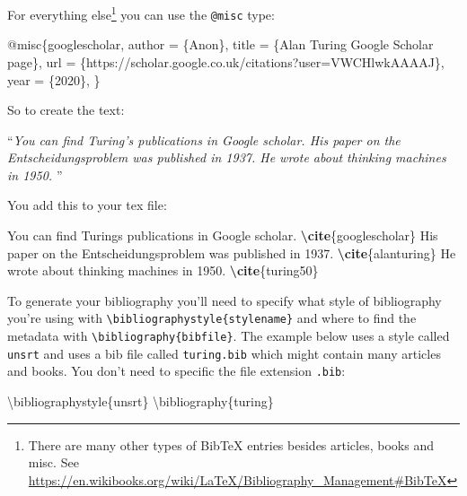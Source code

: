 \documentclass[
]{book}
\newenvironment{Shaded}{\begin{snugshade}}{\end{snugshade}}
\newcommand{\BuiltInTok}[1]{#1}
\newcommand{\ExtensionTok}[1]{#1}
\newcommand{\KeywordTok}[1]{\textcolor[rgb]{0.13,0.29,0.53}{\textbf{#1}}}
\newcommand{\NormalTok}[1]{#1}
\begin{document}
For everything else\footnote{There are many other types of BibTeX entries besides articles, books and misc. See \url{https://en.wikibooks.org/wiki/LaTeX/Bibliography_Management\#BibTeX}} you can use the \texttt{@misc} type:

\begin{Shaded}
\begin{Highlighting}[]
\NormalTok{@misc\{googlescholar,}
\NormalTok{  author       = \{Anon\},}
\NormalTok{  title        = \{Alan Turing Google Scholar page\},}
\NormalTok{  url          = \{https://scholar.google.co.uk/citations?user=VWCHlwkAAAAJ\},}
\NormalTok{  year         = \{2020\},}
\NormalTok{\}}
\end{Highlighting}
\end{Shaded}

So to create the text:

``\emph{You can find Turing's publications in Google scholar. \citep{googlescholar}
His paper on the Entscheidungsproblem was published in 1937. \citep{turing}
He wrote about thinking machines in 1950. \citep{turing50}}''

You add this to your tex file:

\begin{Shaded}
\begin{Highlighting}[]
\NormalTok{You can find Turing\textquotesingle{}s publications in Google scholar. }\KeywordTok{\textbackslash{}cite}\NormalTok{\{}\ExtensionTok{googlescholar}\NormalTok{\}}
\NormalTok{His paper on the Entscheidungsproblem was published in 1937. }\KeywordTok{\textbackslash{}cite}\NormalTok{\{}\ExtensionTok{alanturing}\NormalTok{\}}
\NormalTok{He wrote about thinking machines in 1950. }\KeywordTok{\textbackslash{}cite}\NormalTok{\{}\ExtensionTok{turing50}\NormalTok{\}}
\end{Highlighting}
\end{Shaded}

To generate your bibliography you'll need to specify what style of bibliography you're using with \texttt{\textbackslash{}bibliographystyle\{stylename\}} and where to find the metadata with \texttt{\textbackslash{}bibliography\{bibfile\}}. The example below uses a style called \texttt{unsrt} and uses a bib file called \texttt{turing.bib} which might contain many articles and books. You don't need to specific the file extension \texttt{.bib}:

\begin{Shaded}
\begin{Highlighting}[]
\BuiltInTok{\textbackslash{}bibliographystyle}\NormalTok{\{}\ExtensionTok{unsrt}\NormalTok{\}}
\BuiltInTok{\textbackslash{}bibliography}\NormalTok{\{}\ExtensionTok{turing}\NormalTok{\}}
\end{Highlighting}
\end{Shaded}
\end{document}
